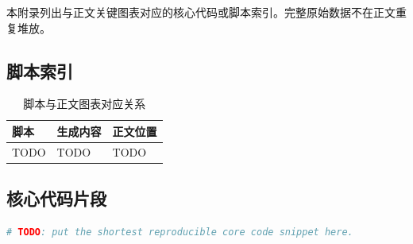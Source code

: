 \documentclass{ctexart}
\begin{document}
本附录列出与正文关键图表对应的核心代码或脚本索引。完整原始数据不在正文重复堆放。

\subsection{脚本索引}
\begin{table}[H]
  \centering
  \caption{脚本与正文图表对应关系}
  \begin{tabularx}{\textwidth}{>{\raggedright\arraybackslash}p{}Y>{\raggedright\arraybackslash}p{0.22\textwidth}}
    \toprule
    脚本 & 生成内容 & 正文位置 \\
    \midrule
    TODO & TODO & TODO \\
    \bottomrule
  \end{tabularx}
\end{table}

\subsection{核心代码片段}
\begin{lstlisting}[language=Python]
# TODO: put the shortest reproducible core code snippet here.
\end{lstlisting}
\end{document}
